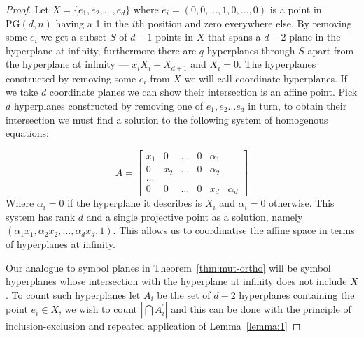 \documentclass{article}
\newcommand{\PG}{\mathrm{PG}}
\begin{document}
\begin{proof}
  Let \(X = \{e_{1}, e_{2}, \ldots, e_{d}\}\) where \(e_{i} = (0, 0, \ldots, 1, 0, \ldots, 0)\) is a point in \(\PG(d, n)\) having a 1 in the \(i\)th position and zero everywhere else.
  By removing some \(e_i\) we get a subset \(S\) of \(d - 1\) points in \(X\) that spans a \(d - 2\) plane in the hyperplane at infinity, furthermore there are \(q\) hyperplanes through \(S\) apart from the hyperplane at infinity --- \(x_i X_i + X_{d + 1}\) and \(X_{i} = 0\).
  The hyperplanes constructed by removing some \(e_i\) from \(X\) we will call coordinate hyperplanes. If we take \(d\) coordinate planes we can show their intersection is an affine point. Pick \(d\) hyperplanes constructed by removing one of \(e_1, e_2 \ldots e_d\) in turn,
  to obtain their intersection we must find a solution to the following system of homogenous equations:

  \begin{equation*}
    A = \begin{bmatrix}
      x_1 & 0 & \ldots & 0 & \alpha_1 \\
      0 & x_2 & \ldots & 0 & \alpha_2 \\
      \ldots \\ 
      0 & 0 & \ldots & 0 & x_d & \alpha_d
    \end{bmatrix}
  \end{equation*}
  Where \(\alpha_i = 0\) if the hyperplane it describes is \(X_i\) and \(\alpha_i = 0\) otherwise.
  This system has rank \(d\) and a single projective point as a solution, namely \((\alpha_1 x_1, \alpha_2 x_2, \ldots, \alpha_d x_d, 1)\). This allows us to coordinatise the affine space in terms of 
  hyperplanes at infinity.

  Our analogue to symbol planes in Theorem~\ref{thm:mut-ortho} will be symbol hyperplanes whose intersection with the hyperplane at infinity does not include \(X\). To count such hyperplanes let 
  \(A_{i}\) be the set of \(d - 2\) hyperplanes containing the point \(e_{i} \in X\), we wish to count \(|\bigcap A^{\prime}_{i}|\) and this can be done with the principle of inclusion-exclusion and repeated application of Lemma~\ref{lemma:1}


\end{proof}
\end{document}
